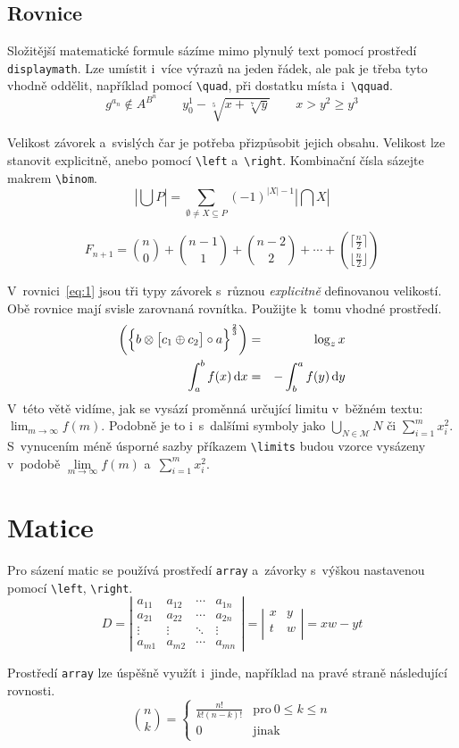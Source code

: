 \documentclass[twocolumn, a4paper, 11pt]{article}
\theoremstyle{plain}
\begin{document}
\subsection{Rovnice}
Složitější matematické formule sázíme mimo plynulý text pomocí prostředí \verb|displaymath|. Lze umístit i~více výrazů na jeden řádek, ale pak je třeba tyto vhodně oddělit, například pomocí \verb|\quad|, při dostatku místa i~\verb|\qquad|.
$$g^{a_n} \notin A^{B^n}\qquad y_0^1-\sqrt[5]{x+\sqrt[7]{y}}\qquad x > y^2 \geq y^3$$

Velikost závorek a~svislých čar je potřeba přizpůsobit jejich obsahu. Velikost lze stanovit explicitně, anebo pomocí \verb|\left| a~\verb|\right|. Kombinační čísla sázejte makrem \verb|\binom|.
$$\left|\bigcup P\right| = \sum\limits_{\emptyset \neq X \subseteq P} (-1)^{|X|-1}\left| \bigcap X \right|$$

$$F_{n+1} = \binom{n}{0}+\binom{n-1}{1}+\binom{n-2}{2}+\cdots+\binom{\lceil \frac{n}{2}\rceil}{\lfloor \frac{n}{2}\rfloor}$$

V~rovnici~\eqref{eq:1} jsou tři typy závorek s~různou \emph{explicitně} definovanou velikostí. Obě rovnice mají svisle zarovnaná rovnítka.
Použijte k~tomu vhodné prostředí.
\begin{eqnarray}
        \biggl(\Bigl\{b \otimes \bigl[c_1 \oplus c_2 \bigr]\circ a\Bigr\}^{\frac{2}{3}}\biggr) & = & \log_z{x} \label{eq:1}\\
        \int_{a}^{b} f(x)\,\mathrm{d}x & = & - \int_{b}^{a} f(y)\,\mathrm{d}y \label{eq:2}
\end{eqnarray}
V~této větě vidíme, jak se vysází proměnná určující limitu v~běžném textu: $\lim_{m \to \infty} f(m)$. Podobně je to i~s~dalšími symboly jako $\bigcup_{N\in \mathcal{M}}N$ či $\sum_{i=1}^m x_i^2$.
S~vynucením méně úsporné sazby příkazem \verb|\limits| budou vzorce vysázeny v~podobě $\lim\limits _{m \to \infty} f(m)$ a~$\sum\limits ^{m}_{i=1} x_i^2$.
\section{Matice}
Pro sázení matic se používá prostředí \verb|array| a~závorky s~výškou nastavenou pomocí \verb+\left+, \verb+\right+.
$$
D = 
\left| \begin{array}{cccc}
               a_{11} & a_{12} & \cdots & a_{1n}\\
               a_{21} & a_{22} & \cdots & a_{2n}\\
               \vdots & \vdots & \ddots & \vdots\\
               a_{m1} & a_{m2} & \cdots & a_{mn}
       \end{array} \right|
 = 
 \left| \begin{array}{cc}
    x & y\\
    t & w\\
        \end{array}\right|
 =
xw - yt
$$

Prostředí \verb|array| lze úspěšně využít i~jinde, například na pravé straně následující rovnosti.
$$ \binom{n}{k} = \left\{
    \begin{array}{ll}
        \frac{n!}{k!(n-k)!} & \mathrm{pro}\ 0 \leq k \leq n\\
        0 & \mathrm{jinak}
    \end{array}
\right. $$
\label{pg:one}
\end{document}
